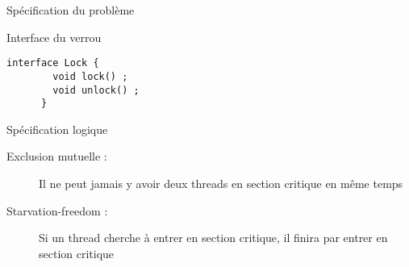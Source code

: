 
\begingroup

\begin{frame}[fragile]{Spécification du problème}

  \begin{block}{Interface du verrou}
    \begin{lstlisting}[gobble=4]
      interface Lock {
        void lock() ;
        void unlock() ;
      }
    \end{lstlisting}
  \end{block}

  \begin{block}{Spécification logique}
    \begin{description}
    \item[Exclusion mutuelle : ] Il ne peut jamais y avoir deux threads en section critique en même temps
    \item[Starvation-freedom : ] Si un thread cherche à entrer en section critique, il finira par entrer en section critique
    \end{description}
  \end{block}
\end{frame}

\endgroup
\endinput
